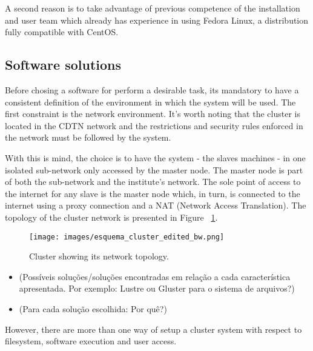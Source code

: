 \documentclass[twoside,a4paper,12pt,english,draft]{inac17}
\begin{document}
A second reason is to take advantage of previous competence of the installation and user team which already has experience
in using Fedora Linux, a distribution fully compatible with CentOS.

\subsection{Software solutions}

Before chosing a software for perform a desirable task, its mandatory to have a consistent definition of the environment
in which the system will be used. The first constraint is the network environment. It's worth noting that the cluster is
located in the CDTN network and the restrictions and security rules enforced in the network must be followed by the system.

With this is mind, the choice is to have the system - the slaves machines - in one isolated sub-network only accessed by
the master node. The master node is part of both the sub-network and the institute's network. The sole point of access to the
internet for any slave is the master node which, in turn, is connected to the internet using a proxy connection and a
NAT (Network Access Translation). The topology of the cluster network is presented in Figure ~\ref{fig:esquema-cluster}.

\begin{figure}[h] %
  \centering\texttt{[image: images/esquema\_cluster\_edited\_bw.png]}
  \caption{Cluster showing its network topology.}
  \label{fig:esquema-cluster}
\end{figure}


\begin{itemize}

\item (Possíveis soluções/soluções encontradas em relação a cada característica apresentada. Por exemplo: Lustre \cite{Lustre} ou Gluster\cite{Gluster} para o sistema de arquivos?)

\item (Para cada solução escolhida: Por quê?)
  
\end{itemize}

However, there are more than one way of setup a cluster system with respect
to filesystem, software execution and user access.
\end{document}
